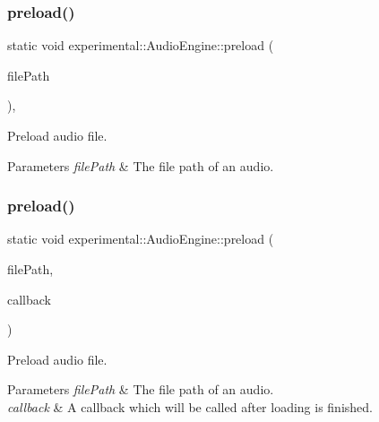 \subsubsection{\texorpdfstring{preload()}{preload()}\hspace{0.1cm}{\footnotesize\ttfamily [2/4]}}
{\footnotesize\ttfamily static void experimental\+::\+Audio\+Engine\+::preload (\begin{DoxyParamCaption}\item[{const std\+::string \&}]{file\+Path }\end{DoxyParamCaption})\hspace{0.3cm}{\ttfamily [inline]}, {\ttfamily [static]}}

Preload audio file. 
\begin{DoxyParams}{Parameters}
{\em file\+Path} & The file path of an audio. \\
\hline
\end{DoxyParams}
\mbox{\label{classexperimental_1_1AudioEngine_abcbafbd980c76ea03872286fd9211b80}} 
\subsubsection{\texorpdfstring{preload()}{preload()}\hspace{0.1cm}{\footnotesize\ttfamily [3/4]}}
{\footnotesize\ttfamily static void experimental\+::\+Audio\+Engine\+::preload (\begin{DoxyParamCaption}\item[{const std\+::string \&}]{file\+Path,  }\item[{std\+::function$<$ void(bool is\+Success)$>$}]{callback }\end{DoxyParamCaption})\hspace{0.3cm}{\ttfamily [static]}}

Preload audio file. 
\begin{DoxyParams}{Parameters}
{\em file\+Path} & The file path of an audio. \\
\hline
{\em callback} & A callback which will be called after loading is finished. \\
\hline
\end{DoxyParams}
\mbox{\label{classexperimental_1_1AudioEngine_abcbafbd980c76ea03872286fd9211b80}} 
